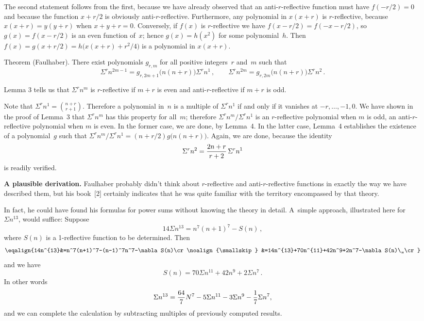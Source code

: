 \proof
The second statement follows from the first, because we  have already
observed that an anti-$r$-reflective function must have $f(-r/2)=0$
and because the function $x+r/2$ is obviously anti-$r$-reflective.
Furthermore, any polynomial in $x(x+r)$ is $r$-reflective, because
$x(x+r)=y(y+r)$ when $x+y+r=0$. Conversely, if $f(x)$ is
$r$-reflective we have $f(x-r/2)=f(-x-r/2)$, so $g(x)=f(x-r/2)$ is an
even function of~$x$; hence $g(x)=h(x^2)$ for some polynomial~$h$.
Then $f(x)=g(x+r/2)=h\bigl(x(x+r)+r^2/4\bigr)$ is a polynomial in
$x(x+r)$.\quad \pfbox

\proclaim
Theorem {\rm (Faulhaber)}. 
There exist polynomials $g_{r,m}$ for all positive integers~$r$
and~$m$ such that
$$\Sigma^rn^{2m-1}=g_{r,2m+1}\bigl(n(n+r)\bigr)\Sigma^rn^1\,,\qquad
\Sigma^rn^{2m}=g_{r,2m}\bigl(n(n+r)\bigr)\Sigma^rn^2\,.$$

\proof
Lemma 3 tells us that $\Sigma^rn^m$ is $r$-reflective if $m+r$ is even
and anti-$r$-reflective if $m+r$ is odd. 

Note that $\Sigma^rn^1={n+r\choose r+1}$. Therefore a polynomial
in~$n$ is a multiple of $\Sigma^rn^1$ if and only if it vanishes at
$-r,\ldots,-1,0$. We have shown in the proof of Lemma~3 that
$\Sigma^rn^m$ has this property for all~$m$; therefore
$\Sigma^rn^m/\Sigma^rn^1$ is an $r$-reflective polynomial when $m$ is
odd, an anti-$r$-reflective polynomial when $m$ is even. In the former
case, we are done, by Lemma~4. In the latter case, Lemma~4 establishes
the existence of a polynomial~$g$ such that
$\Sigma^rn^m/\Sigma^rn^1=(n+r/2)g\bigl(n(n+r)\bigr)$. Again, we are
done, because the identity
$$\Sigma^rn^2={2n+r\over r+2}\,\Sigma^rn^1$$
is readily verified.\quad\pfbox

\bigskip\noindent
{\bf A plausible derivation.}\enspace
Faulhaber probably didn't think about $r$-reflective and
anti-$r$-reflective functions in exactly the way we have described
them, but his book~[2] certainly indicates that he was quite familiar
with the territory encompassed by that theory.

In fact, he could have found his formulas for power sums without
knowing the theory in detail. A~simple approach, illustrated here for
$\Sigma n^{13}$, would suffice: Suppose
$$14\Sigma n^{13}=n^7(n+1)^7-S(n)\,,$$
where $S(n)$ is a 1-reflective function to be determined. Then
$$\eqalign{14n^{13}&=n^7(n+1)^7-(n-1)^7n^7-\nabla S(n)\cr
\noalign{\smallskip}
&=14n^{13}+70n^{11}+42n^9+2n^7-\nabla S(n)\,,\cr}$$
and we have
$$S(n)=70\Sigma n^{11}+42n^9+2\Sigma n^7\,.$$
In other words
$$\Sigma n^{13}={64\over 7}N^7-5\Sigma n^{11}-3\Sigma n^9-{1\over
7}\Sigma n^7,$$
and we can complete the calculation by subtracting multiples of
previously computed results.

